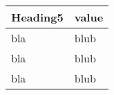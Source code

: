   \begin{tabular}[t]{ll}
    Heading5 & value \\
    \midrule
    bla & blub \\
    bla & blub \\
    bla & blub \\
  \end{tabular}